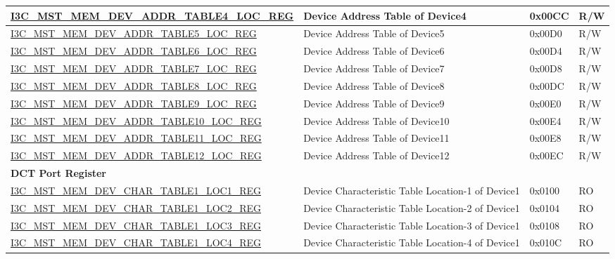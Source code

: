 \begin{longtable}{ | p{8cm} | p{5.5cm} | p{1.3cm} | p{1cm} | }
\hyperref[regdesc:I3CMSTMEMDEVADDRTABLENLOCREG]{I3C\_MST\_MEM\_DEV\_ADDR\_TABLE4\_LOC\_REG} & Device Address Table of Device4 & 0x00CC & R/W \\ \hline
\hyperref[regdesc:I3CMSTMEMDEVADDRTABLENLOCREG]{I3C\_MST\_MEM\_DEV\_ADDR\_TABLE5\_LOC\_REG} & Device Address Table of Device5 & 0x00D0 & R/W \\ \hline
\hyperref[regdesc:I3CMSTMEMDEVADDRTABLENLOCREG]{I3C\_MST\_MEM\_DEV\_ADDR\_TABLE6\_LOC\_REG} & Device Address Table of Device6 & 0x00D4 & R/W \\ \hline
\hyperref[regdesc:I3CMSTMEMDEVADDRTABLENLOCREG]{I3C\_MST\_MEM\_DEV\_ADDR\_TABLE7\_LOC\_REG} & Device Address Table of Device7 & 0x00D8 & R/W \\ \hline
\hyperref[regdesc:I3CMSTMEMDEVADDRTABLENLOCREG]{I3C\_MST\_MEM\_DEV\_ADDR\_TABLE8\_LOC\_REG} & Device Address Table of Device8 & 0x00DC & R/W \\ \hline
\hyperref[regdesc:I3CMSTMEMDEVADDRTABLENLOCREG]{I3C\_MST\_MEM\_DEV\_ADDR\_TABLE9\_LOC\_REG} & Device Address Table of Device9 & 0x00E0 & R/W \\ \hline
\hyperref[regdesc:I3CMSTMEMDEVADDRTABLENLOCREG]{I3C\_MST\_MEM\_DEV\_ADDR\_TABLE10\_LOC\_REG} & Device Address Table of Device10 & 0x00E4 & R/W \\ \hline
\hyperref[regdesc:I3CMSTMEMDEVADDRTABLENLOCREG]{I3C\_MST\_MEM\_DEV\_ADDR\_TABLE11\_LOC\_REG} & Device Address Table of Device11 & 0x00E8 & R/W \\ \hline
\hyperref[regdesc:I3CMSTMEMDEVADDRTABLENLOCREG]{I3C\_MST\_MEM\_DEV\_ADDR\_TABLE12\_LOC\_REG} & Device Address Table of Device12 & 0x00EC & R/W \\ \hline
\multicolumn{4}{|l|}{\textbf{DCT Port Register}} \\ \hline
\hyperref[regdesc:I3CMSTMEMDEVCHARTABLENLOCMREG]{I3C\_MST\_MEM\_DEV\_CHAR\_TABLE1\_LOC1\_REG} & Device Characteristic Table Location-1 of Device1 & 0x0100 & RO \\ \hline
\hyperref[regdesc:I3CMSTMEMDEVCHARTABLENLOCMREG]{I3C\_MST\_MEM\_DEV\_CHAR\_TABLE1\_LOC2\_REG} & Device Characteristic Table Location-2 of Device1 & 0x0104 & RO \\ \hline
\hyperref[regdesc:I3CMSTMEMDEVCHARTABLENLOCMREG]{I3C\_MST\_MEM\_DEV\_CHAR\_TABLE1\_LOC3\_REG} & Device Characteristic Table Location-3 of Device1 & 0x0108 & RO \\ \hline
\hyperref[regdesc:I3CMSTMEMDEVCHARTABLENLOCMREG]{I3C\_MST\_MEM\_DEV\_CHAR\_TABLE1\_LOC4\_REG} & Device Characteristic Table Location-4 of Device1 & 0x010C & RO \\ \hline

\end{longtable}
